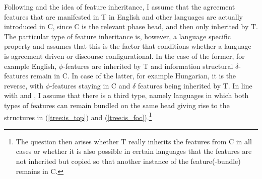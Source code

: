 \documentclass[output=paper
,modfonts
,nonflat]{langsci/langscibook}
\begin{document}
\noindent Following \citet{Chomsky2008} and the idea of feature inheritance, I assume that the agreement features that are manifested in T in English and other languages are actually introduced in C, since C is the relevant phase head, and then only inherited by T. The particular type of feature inheritance is, however, a language specific property and \citet{Miyagawa2010,Miyagawa2017} assumes that this is the factor that conditions whether a language is agreement driven or discourse configurational. In the case of the former, for example English, $ \phi $-features are inherited by T and information structural $ \delta $-features remain in C. In case of the latter, for example Hungarian, it is the reverse, with $ \phi $-features staying in C and $ \delta $ features being inherited by T. In line with \citet{Jimenez-Fernandez2010} and \citet{Miyagawa2017}, I assume that there is a third type, namely languages in which both types of features can remain bundled on the same head giving rise to the structures in (\ref{tree:is_top}) and (\ref{tree:is_foc}).\footnote{The question then arises whether T really inherits the features from C in all cases or whether it is also possible in certain languages that the features are not inherited but copied so that another instance of the feature(-bundle) remains in C.}
\end{document}
